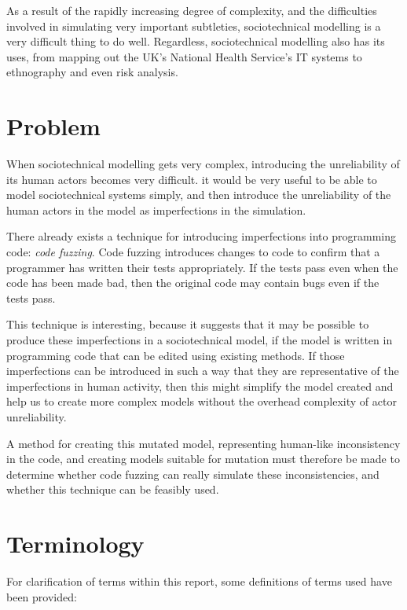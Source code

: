 As a result of the rapidly increasing degree of complexity, and the difficulties involved in simulating very important subtleties, sociotechnical modelling is a very difficult thing to do well. Regardless, sociotechnical modelling also has its uses, from mapping out the UK's National Health Service's IT systems\cite{Brennan2007} to ethnography\cite{Crabtree2000} and even risk analysis\cite{Storer2010}. \par

\section{Problem}
When sociotechnical modelling gets very complex, introducing the unreliability of its human actors becomes very difficult. it would be very useful to be able to model sociotechnical systems simply, and then introduce the unreliability of the human actors in the model as imperfections in the simulation. \par

There already exists a technique for introducing imperfections into programming code: \emph{code fuzzing}. Code fuzzing introduces changes to code to confirm that a programmer has written their tests appropriately. If the tests pass even when the code has been made bad, then the original code may contain bugs even if the tests pass. \par

This technique is interesting, because it suggests that it may be possible to produce these imperfections in a sociotechnical model, if the model is written in programming code that can be edited using existing methods. If those imperfections can be introduced in such a way that they are representative of the imperfections in human activity, then this might simplify the model created and help us to create more complex models without the overhead complexity of actor unreliability. \par

A method for creating this mutated model, representing human-like inconsistency in the code, and creating models suitable for mutation must therefore be made to determine whether code fuzzing can really simulate these inconsistencies, and whether this technique can be feasibly used. \par

\section{Terminology}
For clarification of terms within this report, some definitions of terms used have been provided: 
\label{introducing_technology}

